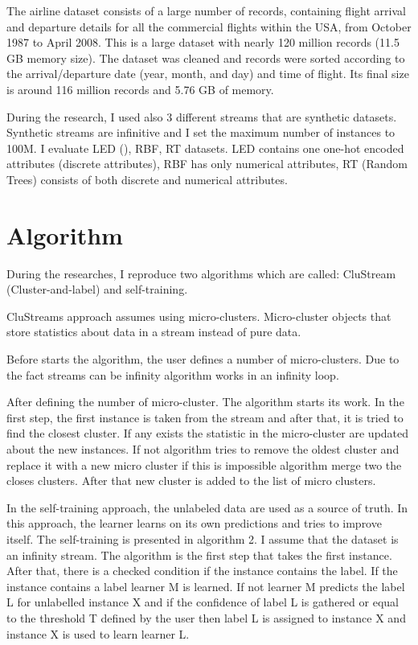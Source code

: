 \documentclass[twocolumn]{article}
\begin{document}
    The airline dataset consists of a large number of records, containing flight arrival and departure details for all the commercial flights within the USA, from October 1987 to April 2008.
    This is a large dataset with nearly 120 million records (11.5 GB memory size).
    The dataset was cleaned and records were sorted according to the arrival/departure date (year, month, and day) and time of flight.
    Its final size is around 116 million records and 5.76 GB of memory.

    During the research, I used also 3 different streams that are synthetic datasets.
    Synthetic streams are infinitive and I set the maximum number of instances to 100M.
    I evaluate LED (), RBF, RT datasets.
    LED contains one one-hot encoded attributes  (discrete attributes), RBF has only numerical attributes, RT (Random Trees) consists of both discrete and numerical attributes.

    \section*{Algorithm}

    During the researches, I reproduce two algorithms which are called: CluStream (Cluster-and-label) and self-training.

    CluStreams approach assumes using micro-clusters.
    Micro-cluster objects that store statistics about data in a stream instead of pure data.

    Before starts the algorithm, the user defines a number of micro-clusters.
    Due to the fact streams can be infinity algorithm works in an infinity loop.

    After defining the number of micro-cluster. The algorithm starts its work.
    In the first step, the first instance is taken from the stream and after that, it is tried to find the closest cluster.
    If any exists the statistic in the micro-cluster are updated about the new instances.
    If not algorithm tries to remove the oldest cluster and replace it with a new micro cluster if this is impossible algorithm merge two the closes clusters.
    After that new cluster is added to the list of micro clusters.

    In the self-training approach, the unlabeled data are used as a source of truth.
    In this approach, the learner learns on its own predictions and tries to improve itself.
    The self-training is presented in algorithm 2.
    I assume that the dataset is an infinity stream.
    The algorithm is the first step that takes the first instance.
    After that, there is a checked condition if the instance contains the label.
    If the instance contains a label learner M is learned.
    If not learner M predicts the label L for unlabelled instance X and if the confidence of label L is gathered or equal to the threshold T defined by the user then label L is assigned to instance X and instance X is used to learn learner L.
\end{document}
